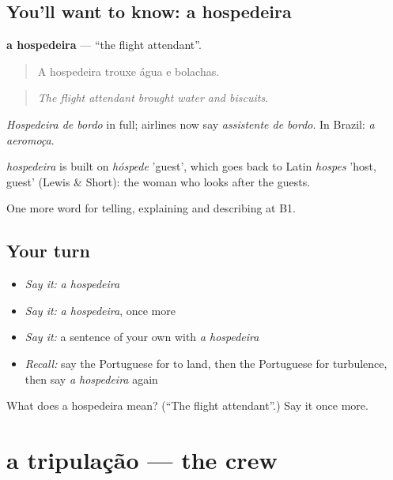 \subsection*{You'll want to know: a hospedeira}
\textbf{a hospedeira} — \textquotedblleft{}the flight attendant\textquotedblright{}.

\begin{quote}
A hospedeira trouxe água e bolachas.
\end{quote}

\begin{quote}
\emph{The flight attendant brought water and biscuits.}
\end{quote}

\emph{Hospedeira de bordo} in full; airlines now say \emph{assistente de bordo}. In Brazil: \emph{a aeromoça}.

\begin{cousinweb}
\emph{hospedeira} is built on \emph{hóspede} 'guest', which goes back to Latin \emph{hospes} 'host, guest' (Lewis \& Short): the woman who looks after the guests.
\end{cousinweb}

\begin{grammarlens}[title={What you've built}]
One more word for telling, explaining and describing at B1.
\end{grammarlens}

\subsection*{Your turn}
\begin{itemize}
\raggedright
  \item \emph{Say it:} \emph{a hospedeira}
  \item \emph{Say it:} \emph{a hospedeira}, once more
  \item \emph{Say it:} a sentence of your own with \emph{a hospedeira}
  \item \emph{Recall:} say the Portuguese for to land, then the Portuguese for turbulence, then say \emph{a hospedeira} again
\end{itemize}

\begin{tcolorbox}[breakable,colback=teal!4,colframe=teal!35!black,title={Before you move on}]
What does a hospedeira mean? (\textquotedblleft{}The flight attendant\textquotedblright{}.) Say it once more.
\end{tcolorbox}
\section[a tripulação]{a tripulação — the crew}

